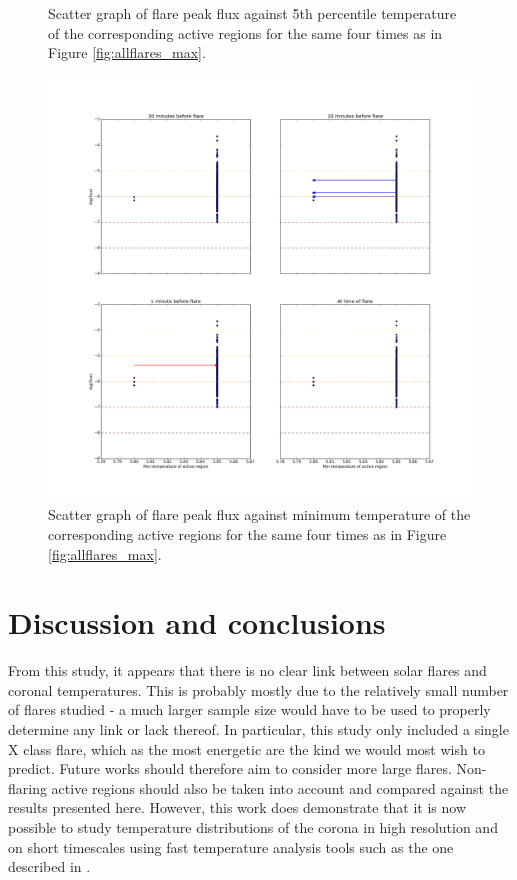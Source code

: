 \documentclass[referee,a4paper,12pt]{swsc}
\begin{document}
\begin{linenumbers}
\begin{figure}
	\caption{Scatter graph of flare peak flux against 5th percentile temperature of the corresponding active regions for the same four times as in Figure \ref{fig:allflares_max}.}
	\label{fig:allflares_p5}
\end{figure}
\begin{figure}
	\centering
		\includegraphics[width=0.9\columnwidth]{tempplots_min/allflares.png}
	\caption{Scatter graph of flare peak flux against minimum temperature of the corresponding active regions for the same four times as in Figure \ref{fig:allflares_max}.}
	\label{fig:allflares_min}
\end{figure}

\section{Discussion and conclusions}
From this study, it appears that there is no clear link between solar flares and coronal temperatures.
This is probably mostly due to the relatively small number of flares studied - a much larger sample size would have to be used to properly determine any link or lack thereof.
In particular, this study only included a single X class flare, which as the most energetic are the kind we would most wish to predict.
Future works should therefore aim to consider more large flares.
Non-flaring active regions should also be taken into account and compared against the results presented here.
However, this work does demonstrate that it is now possible to study temperature distributions of the corona in high resolution and on short timescales using fast temperature analysis tools such as the one described in .


\end{linenumbers}
\end{document}

